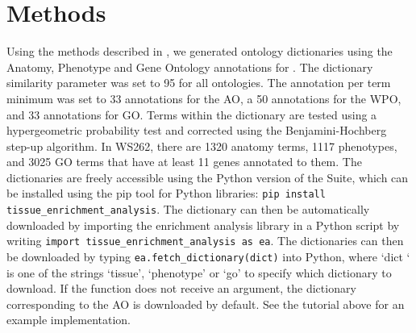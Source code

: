 \section*{Methods}
Using the methods described in \citet{Angeles-Albores2016}, we
generated ontology dictionaries using the Anatomy, Phenotype and Gene Ontology
annotations for \cel{}. The dictionary similarity parameter was set to 95%
for all ontologies. The annotation per term minimum was set to 33 annotations
for the AO, a 50 annotations for the WPO, and 33 annotations for GO. Terms
within the dictionary are tested using a hypergeometric probability test and
corrected using the Benjamini-Hochberg step-up algorithm. In WS262, there are
1320 anatomy terms, 1117 phenotypes, and 3025 GO terms that have at least 11
genes annotated to them. The dictionaries are freely accessible using the Python
version of the Suite, which can be installed using the pip tool for Python
libraries: \texttt{pip install tissue\_enrichment\_analysis}. The dictionary can
then be automatically downloaded by importing the enrichment analysis library in
a Python script by writing \texttt{import tissue\_enrichment\_analysis as ea}.
The dictionaries can then be downloaded by  typing
\texttt{ea.fetch\_dictionary(dict)} into Python, where `dict ` is one of the
strings `tissue', `phenotype' or `go' to specify which dictionary to download.
If the function does not receive an argument, the dictionary corresponding to
the AO is downloaded by default. See the tutorial above for an example
implementation.
